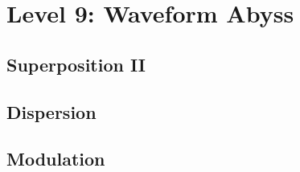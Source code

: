 

\section{Level 9: Waveform Abyss}
\subsection{Superposition II}
\subsection{Dispersion}
\subsection{Modulation}
